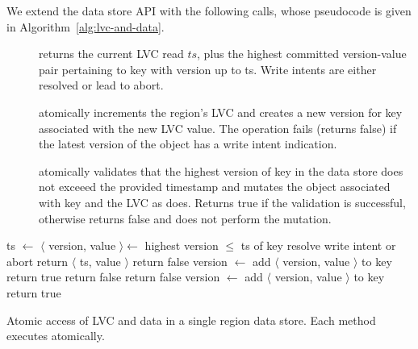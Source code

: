 We extend the data store API with the following calls, whose 
pseudocode is given in Algorithm~\ref{alg:lvc-and-data}. 

\begin{description}
   \item []  returns the current LVC read $ts$, plus the highest committed version-value pair pertaining to key with version up to ts.
   Write intents are either resolved or lead to abort.
   \item[] atomically increments the region's LVC
  and creates a new version for key associated with the new LVC value. The
  operation fails (returns false) if the latest version of the object has a write intent indication. 
   \item []
atomically validates that the  highest version of key in the data store does not exceeed the provided timestamp
and mutates the  object associated with key and the LVC as  does. Returns true if the
validation is successful, otherwise returns false and does not perform the mutation. 
\end{description}

\begin{algorithm}[htb]
\begin{algorithmic}
\State ts $\leftarrow$ 
\State $\langle$ version, value $\rangle \leftarrow$ highest version  $\leq$ ts of key
	\State resolve write intent or abort
\EndIf
\State return $\langle$ ts, value $\rangle$ 
\EndProcedure
\Statex
%
\State return false
\EndIf
\State  version $\leftarrow$ 
\State add $\langle$ version, value $\rangle$ to key
\State return true
\EndProcedure
\Statex
%
	\State return false
\EndIf
{}
	\State return false
\EndIf
{}
\State  version $\leftarrow$ 
\State add $\langle$ version, value $\rangle$ to key
\State return true
\EndProcedure
%
\end{algorithmic}
\caption{Atomic access of LVC and data in a single region data store. Each method executes atomically.}
\label{alg:lvc-and-data}
\end{algorithm}


